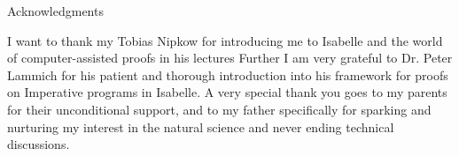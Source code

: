 \thispagestyle{empty}

\vspace*{20mm}

\begin{center}
{ Acknowledgments}
\end{center}

\vspace{10mm}
I want to thank my Tobias Nipkow for introducing me to
Isabelle and the world of computer-assisted proofs in his lectures
Further I am very grateful to Dr. Peter Lammich for his patient
and thorough introduction into his framework for proofs on Imperative
programs in Isabelle.
A very special thank you goes to my parents for their unconditional support,
and to my father specifically
for sparking and nurturing my interest in the natural science
and never ending technical discussions.


\cleardoublepage{}
